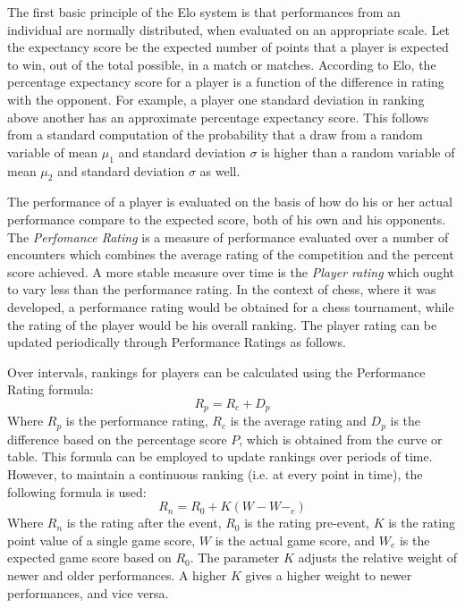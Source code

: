 The first basic principle of the Elo system is that performances from an individual are normally distributed, when evaluated on an appropriate scale. Let the expectancy score be the expected number of points that a player is expected to win, out of the total possible, in a match or matches. According to Elo, the percentage expectancy score for a player is a function of the difference in rating with the opponent. For example, a player one standard deviation in ranking above another has an approximate  percentage expectancy score. This follows from a standard computation of the probability that a draw from a random variable of mean $\mu_1$ and standard deviation $\sigma$ is higher than a random variable of mean $\mu_2$ and standard deviation $\sigma$ as well.

The performance of a player is evaluated on the basis of how do his or her actual performance compare to the expected score, both of his own and his opponents. The \textit{Perfomance Rating} is a measure of performance evaluated over a number of encounters which combines the average rating of the competition and the percent score achieved. A more stable measure over time is the \textit{Player rating} which ought to vary less than the performance rating. In the context of chess, where it was developed, a performance rating would be obtained for a chess tournament, while the rating of the player would be his overall ranking. The player rating can be updated periodically through Performance Ratings as follows.

Over intervals, rankings for players can be calculated using the Performance Rating formula:
\begin{equation}
  R_p=R_c+D_p
  \label{ratingdiscrete}
\end{equation}
Where $R_p$ is the performance rating, $R_c$ is the average rating and $D_p$ is the difference based on the percentage score $P$, which is obtained from the curve or table. This formula can be employed to update rankings over periods of time. However, to maintain a continuous ranking (i.e. at every point in time), the following formula is used:
\begin{equation}
  R_n=R_0 + K(W-W-_e)
  \label{ratingcontinuous}
\end{equation}
Where $R_n$ is the rating after the event, $R_0$ is the rating pre-event, $K$ is the rating point value of a single game score, $W$ is the actual game score, and $W_e$ is the expected game score based on $R_0$. The parameter $K$ adjusts the relative weight of newer and older performances. A higher $K$ gives a higher weight to newer performances, and vice versa.

